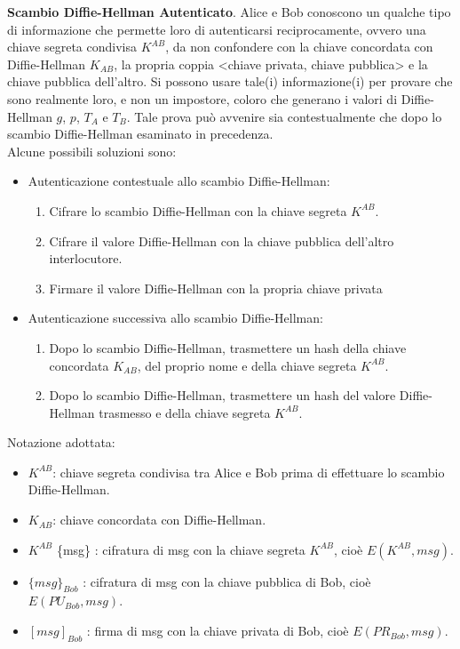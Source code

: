 \textbf{Scambio Diffie-Hellman Autenticato}. Alice e Bob conoscono un qualche tipo di informazione che permette loro di autenticarsi reciprocamente, ovvero una chiave segreta condivisa $K^{AB}$, da non confondere con la chiave concordata con Diffie-Hellman $K_{AB}$, la propria coppia <chiave privata, chiave pubblica> e la chiave
pubblica dell'altro. Si possono usare tale(i) informazione(i) per provare che sono realmente loro, e non un impostore, coloro che generano i valori di Diffie-Hellman $g$, $p$, $T_{A}$ e $T_{B}$. Tale prova può avvenire sia contestualmente che dopo lo scambio Diffie-Hellman esaminato in precedenza. \\ Alcune possibili soluzioni sono:
\begin{itemize}
\item Autenticazione contestuale allo scambio Diffie-Hellman: \begin{enumerate}
\item Cifrare lo scambio Diffie-Hellman con la chiave segreta $K^{AB}$.
\item Cifrare il valore Diffie-Hellman con la chiave pubblica dell'altro interlocutore.
\item Firmare il valore Diffie-Hellman con la propria chiave privata
\end{enumerate}
\item Autenticazione successiva allo scambio Diffie-Hellman:
\begin{enumerate}
\item Dopo lo scambio Diffie-Hellman, trasmettere un hash della chiave concordata $K_{AB}$, del proprio nome e della chiave segreta $K^{AB}$.
\item Dopo lo scambio Diffie-Hellman, trasmettere un hash del valore
Diffie-Hellman trasmesso e della chiave segreta $K^{AB}$.
\end{enumerate}
\end{itemize}
Notazione adottata: \begin{itemize}
\item $K^{AB}$: chiave segreta condivisa tra Alice e Bob prima di effettuare lo scambio Diffie-Hellman.
\item $K_{AB}$: chiave concordata con Diffie-Hellman.
\item $K^{AB}$ \{msg\} : cifratura di msg con la chiave segreta $K^{AB}$, cioè $E(K^{AB}, msg)$.
\item $\{msg\}_{Bob}$ : cifratura di msg con la chiave pubblica di Bob, cioè $E(PU_{Bob}, msg)$.
\item $[msg]_{Bob}$ : firma di msg con la chiave privata di Bob, cioè
$E(PR_{Bob}, msg)$.
\end{itemize}

